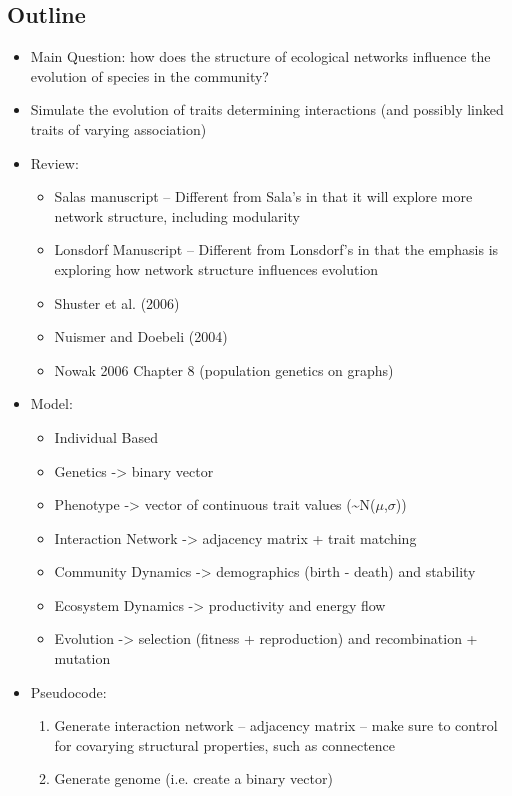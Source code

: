 \documentclass[12pt]{article}
\begin{document}
\subsection*{Outline}
\begin{itemize}
\item Main Question: how does the structure of ecological networks
  influence the evolution of species in the community?
\item Simulate the evolution of traits determining interactions (and
  possibly linked traits of varying association)
\item Review:
  \begin{itemize}
  \item Salas manuscript
    \subitem -- Different from Sala's in that it will explore more
    network structure, including modularity
  \item Lonsdorf Manuscript
    \subitem -- Different from Lonsdorf's in that the emphasis is
    exploring how network structure influences evolution
  \item Shuster et al. (2006)
  \item Nuismer and Doebeli (2004)
  \item Nowak 2006 Chapter 8 (population genetics on graphs)
  \end{itemize}
\item Model:
  \begin{itemize}
  \item Individual Based
  \item Genetics -> binary vector
  \item Phenotype -> vector of continuous trait values (\sim N($\mu$,$\sigma$))
  \item Interaction Network -> adjacency matrix + trait matching
  \item Community Dynamics -> demographics (birth - death) and stability
  \item Ecosystem Dynamics -> productivity and energy flow
  \item Evolution -> selection (fitness + reproduction) and
    recombination + mutation
  \end{itemize}
\item Pseudocode:
  \begin{enumerate}
  \item Generate interaction network
    \subitem -- adjacency matrix
    \subitem -- make sure to control for covarying structural
    properties, such as connectence
  \item Generate genome (i.e. create a binary vector)

\end{enumerate}
\end{itemize}
\end{document}
